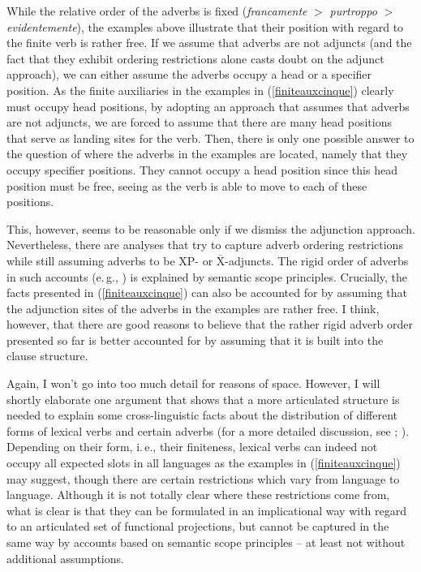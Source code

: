 \noindent While the relative order of the adverbs is fixed (\textit{francamente} $>$ \textit{purtroppo} $>$ \textit{evidentemente}), the examples above illustrate that their position with regard to the finite verb is rather free. If we assume that adverbs are not adjuncts (and the fact that they exhibit ordering restrictions alone casts doubt on the adjunct approach), we can either assume the adverbs occupy a head or a specifier position. As the finite auxiliaries in the examples in (\ref{finiteauxcinque}) clearly must occupy head positions, by adopting an approach that assumes that adverbs are not adjuncts, we are forced to assume that there are many head positions that serve as landing sites for the verb. Then, there is only one possible answer to the question of where the adverbs in the examples are located, namely that they occupy specifier positions. They cannot occupy a head position since this head position must be free, seeing as the verb is able to move to each of these positions.

This, however, seems to be reasonable only if we dismiss the adjunction approach. Nevertheless, there are analyses that try to capture adverb ordering restrictions while still assuming adverbs to be XP- or $\overline{\textrm{X}}$-adjuncts. The rigid order of adverbs in such accounts (e.\,g., \citealt{ernst2002syntax, ernst2007role}) is explained by semantic scope principles. Crucially, the facts presented in (\ref{finiteauxcinque}) can also be accounted for by assuming that the adjunction sites of the adverbs in the examples are rather free. I think, however, that there are good reasons to believe that the rather rigid adverb order presented so far is better accounted for by assuming that it is built into the clause structure.

Again, I won't go into too much detail for reasons of space. However, I will shortly elaborate one argument that shows that a more articulated structure is needed to explain some cross-linguistic facts about the distribution of different forms of lexical verbs and certain adverbs (for a more detailed discussion, see \citealt[44--51]{cinque1999adverbs}; \citealt{cinque2004issues}). Depending on their form, i.\,e., their finiteness, lexical verbs can indeed not occupy all expected slots in all languages as the examples in (\ref{finiteauxcinque}) may suggest, though there are certain restrictions which vary from language to language. Although it is not totally clear where these restrictions come from, what is clear is that they can be formulated in an implicational way with regard to an articulated set of functional projections, but cannot be captured in the same way by accounts based on semantic scope principles -- at least not without additional assumptions.

